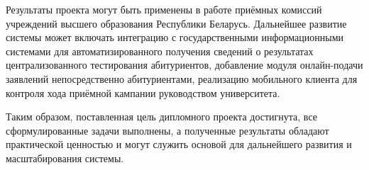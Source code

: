 Результаты проекта могут быть применены в работе приёмных комиссий учреждений высшего образования Республики Беларусь.
Дальнейшее развитие системы может включать интеграцию с государственными информационными системами для автоматизированного получения сведений о результатах централизованного тестирования абитуриентов, добавление модуля онлайн-подачи заявлений непосредственно абитуриентами, реализацию мобильного клиента для контроля хода приёмной кампании руководством университета.

Таким образом, поставленная цель дипломного проекта достигнута, все сформулированные задачи выполнены, а полученные результаты обладают практической ценностью и могут служить основой для дальнейшего развития и масштабирования системы.\label{lastmainpage}
